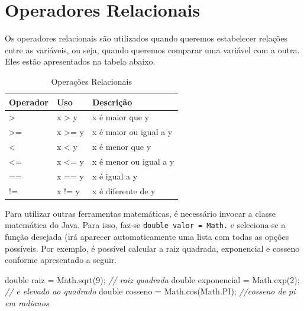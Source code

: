 \documentclass[
]{book}
\newenvironment{Shaded}{\begin{snugshade}}{\end{snugshade}}
\newcommand{\BuiltInTok}[1]{#1}
\newcommand{\CommentTok}[1]{\textcolor[rgb]{0.56,0.35,0.01}{\textit{#1}}}
\newcommand{\DataTypeTok}[1]{\textcolor[rgb]{0.13,0.29,0.53}{#1}}
\newcommand{\DecValTok}[1]{\textcolor[rgb]{0.00,0.00,0.81}{#1}}
\newcommand{\FunctionTok}[1]{\textcolor[rgb]{0.00,0.00,0.00}{#1}}
\newcommand{\NormalTok}[1]{#1}
\begin{document}
\hypertarget{operadores-relacionais}{%
\section{Operadores Relacionais}\label{operadores-relacionais}}

Os operadores relacionais são utilizados quando queremos estabelecer relações entre as variáveis, ou seja, quando queremos comparar uma variável com a outra. Eles estão apresentados na tabela abaixo.

\begin{table}

\caption{\label{tab:unnamed-chunk-6}Operações Relacionais}
\centering
\begin{tabular}[t]{l|l|l}
\hline
Operador & Uso & Descrição\\
\hline
> & x > y & x é maior que y\\
\hline
>= & x >= y & x é maior ou igual a y\\
\hline
< & x < y & x é menor que y\\
\hline
<= & x <= y & x é menor ou igual a y\\
\hline
== & x == y & x é igual a y\\
\hline
!= & x != y & x é diferente de y\\
\hline
\end{tabular}
\end{table}

Para utilizar outras ferramentas matemáticas, é necessário invocar a classe matemática do Java. Para isso, faz-se \texttt{double\ valor\ =\ Math.} e seleciona-se a função desejada (irá aparecer automaticamente uma lista com todas as opções possíveis. Por exemplo, é possível calcular a raiz quadrada, exponencial e cosseno conforme apresentado a seguir.

\begin{Shaded}
\begin{Highlighting}[]
\DataTypeTok{double}\NormalTok{ raiz = }\BuiltInTok{Math}\NormalTok{.}\FunctionTok{sqrt}\NormalTok{(}\DecValTok{9}\NormalTok{); }\CommentTok{// raiz quadrada}
\DataTypeTok{double}\NormalTok{ exponencial = }\BuiltInTok{Math}\NormalTok{.}\FunctionTok{exp}\NormalTok{(}\DecValTok{2}\NormalTok{); }\CommentTok{// e elevado ao quadrado}
\DataTypeTok{double}\NormalTok{ cosseno  = }\BuiltInTok{Math}\NormalTok{.}\FunctionTok{cos}\NormalTok{(}\BuiltInTok{Math}\NormalTok{.}\FunctionTok{PI}\NormalTok{); }\CommentTok{//cosseno de pi em radianos}
\end{Highlighting}
\end{Shaded}
\end{document}
